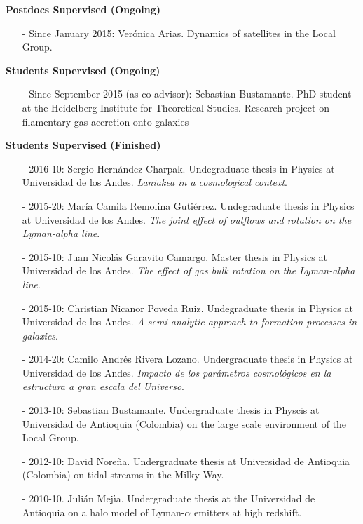 \documentclass[letterpaper,11pt,onecolumn]{article}
\begin{document}
{\bf Postdocs Supervised (Ongoing)}
\begin{itemize}
\item[-] Since January 2015: Ver\'onica Arias. Dynamics of satellites
  in the Local Group. 
\end{itemize}

{\bf Students Supervised (Ongoing)}

\begin{itemize}
\item[-] Since September 2015 (as co-advisor): Sebastian
  Bustamante. PhD student at the Heidelberg Institute for Theoretical
  Studies. Research project on filamentary gas accretion onto galaxies
\end{itemize}

{\bf Students Supervised (Finished)}
\begin{itemize}
\item[-] 2016-10: Sergio Hern\'andez Charpak. Undegraduate
  thesis in Physics at Universidad de los Andes. \emph{Laniakea in a cosmological context}. 
\item[-] 2015-20: Mar\'ia Camila Remolina Guti\'errez. Undegraduate
  thesis in Physics at Universidad de los Andes. \emph{The joint
    effect of outflows and rotation on the Lyman-alpha line}. 
\item[-] 2015-10: Juan Nicol\'as Garavito Camargo. Master
  thesis in Physics at Universidad de los Andes. \emph{The effect of
    gas bulk rotation on the Lyman-alpha line}.
\item[-] 2015-10: Christian Nicanor Poveda Ruiz. Undegraduate thesis
  in Physics at Universidad de los Andes. \emph{A semi-analytic
    approach to formation processes in galaxies}. 
\item[-] 2014-20: Camilo Andr\'es Rivera Lozano. Undergraduate thesis
  in Physics at Universidad de los Andes. \emph{Impacto de los
    par\'ametros cosmol\'ogicos en la 
    estructura a gran escala del Universo}.
\item[-] 2013-10: Sebastian Bustamante. Undergraduate thesis in
  Physcis at Universidad de Antioquia (Colombia) on the large scale environment
  of the Local Group.  
\item[-] 2012-10: David Nore\~na. Undergraduate thesis at Universidad
  de Antioquia (Colombia) on tidal streams in the Milky Way. 
\item[-] 2010-10. Juli\'an Mej\'{\i}a. Undergraduate thesis at the
  Universidad de Antioquia on a halo model of
  Lyman-$\alpha$ emitters at high redshift. 
\end{itemize}
\end{document}
